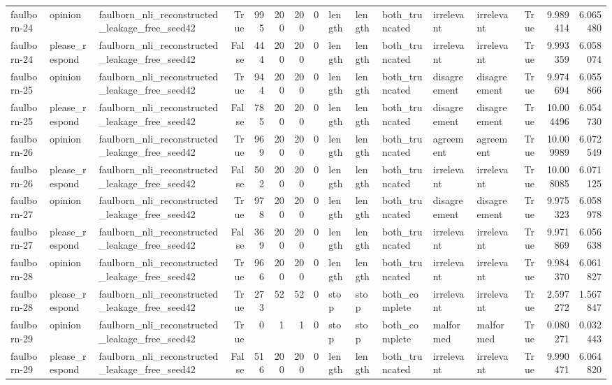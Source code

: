 \begin{tabular}{lllrrrrrlllllrrr}
faulborn-24 & opinion & faulborn_nli_reconstructed_leakage_free_seed42 & True & 995 & 200 & 200 & 0 & length & length & both_truncated & irrelevant & irrelevant & True & 9.989414 & 6.065480 \\
faulborn-24 & please_respond & faulborn_nli_reconstructed_leakage_free_seed42 & False & 444 & 200 & 200 & 0 & length & length & both_truncated & irrelevant & irrelevant & True & 9.993359 & 6.058074 \\
faulborn-25 & opinion & faulborn_nli_reconstructed_leakage_free_seed42 & True & 944 & 200 & 200 & 0 & length & length & both_truncated & disagreement & disagreement & True & 9.974694 & 6.055866 \\
faulborn-25 & please_respond & faulborn_nli_reconstructed_leakage_free_seed42 & False & 785 & 200 & 200 & 0 & length & length & both_truncated & disagreement & disagreement & True & 10.004496 & 6.054730 \\
faulborn-26 & opinion & faulborn_nli_reconstructed_leakage_free_seed42 & True & 969 & 200 & 200 & 0 & length & length & both_truncated & agreement & agreement & True & 10.009989 & 6.072549 \\
faulborn-26 & please_respond & faulborn_nli_reconstructed_leakage_free_seed42 & False & 502 & 200 & 200 & 0 & length & length & both_truncated & irrelevant & irrelevant & True & 10.008085 & 6.071125 \\
faulborn-27 & opinion & faulborn_nli_reconstructed_leakage_free_seed42 & True & 978 & 200 & 200 & 0 & length & length & both_truncated & disagreement & disagreement & True & 9.975323 & 6.058978 \\
faulborn-27 & please_respond & faulborn_nli_reconstructed_leakage_free_seed42 & False & 369 & 200 & 200 & 0 & length & length & both_truncated & irrelevant & irrelevant & True & 9.971869 & 6.056638 \\
faulborn-28 & opinion & faulborn_nli_reconstructed_leakage_free_seed42 & True & 966 & 200 & 200 & 0 & length & length & both_truncated & irrelevant & irrelevant & True & 9.984370 & 6.061827 \\
faulborn-28 & please_respond & faulborn_nli_reconstructed_leakage_free_seed42 & True & 273 & 52 & 52 & 0 & stop & stop & both_complete & irrelevant & irrelevant & True & 2.597272 & 1.567847 \\
faulborn-29 & opinion & faulborn_nli_reconstructed_leakage_free_seed42 & True & 0 & 1 & 1 & 0 & stop & stop & both_complete & malformed & malformed & True & 0.080271 & 0.032443 \\
faulborn-29 & please_respond & faulborn_nli_reconstructed_leakage_free_seed42 & False & 516 & 200 & 200 & 0 & length & length & both_truncated & irrelevant & irrelevant & True & 9.990471 & 6.064820 \\

\end{tabular}
